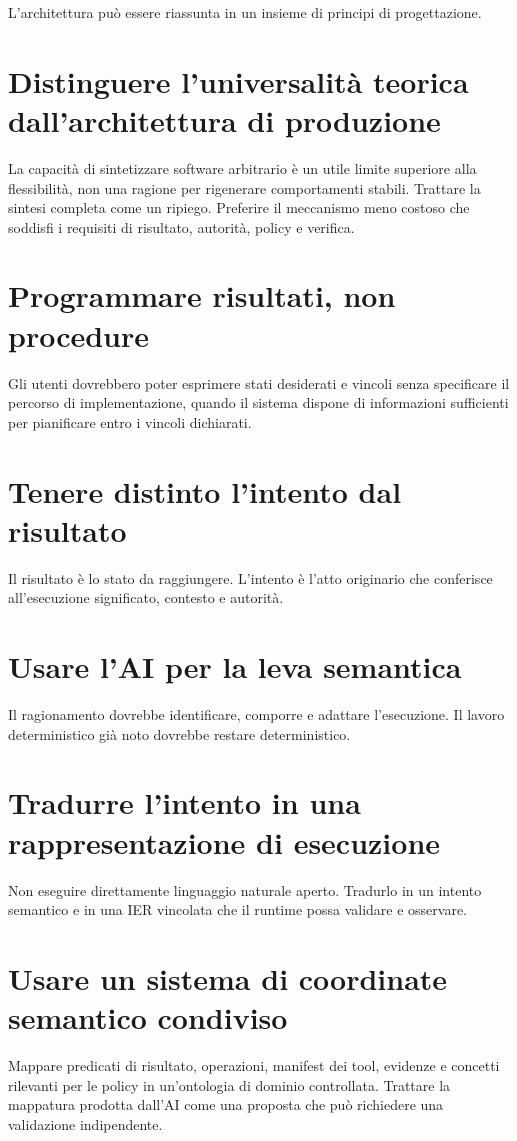 \documentclass[10pt,oneside,openany]{book}
\begin{document}
L'architettura può essere riassunta in un insieme di principi di progettazione.

\section{Distinguere l'universalità teorica dall'architettura di produzione}
La capacità di sintetizzare software arbitrario è un utile limite superiore alla flessibilità, non una ragione per rigenerare comportamenti stabili. Trattare la sintesi completa come un ripiego. Preferire il meccanismo meno costoso che soddisfi i requisiti di risultato, autorità, policy e verifica.

\section{Programmare risultati, non procedure}
Gli utenti dovrebbero poter esprimere stati desiderati e vincoli senza specificare il percorso di implementazione, quando il sistema dispone di informazioni sufficienti per pianificare entro i vincoli dichiarati.

\section{Tenere distinto l'intento dal risultato}
Il risultato è lo stato da raggiungere. L'intento è l'atto originario che conferisce all'esecuzione significato, contesto e autorità.

\section{Usare l'AI per la leva semantica}
Il ragionamento dovrebbe identificare, comporre e adattare l'esecuzione. Il lavoro deterministico già noto dovrebbe restare deterministico.

\section{Tradurre l'intento in una rappresentazione di esecuzione}
Non eseguire direttamente linguaggio naturale aperto. Tradurlo in un intento semantico e in una IER vincolata che il runtime possa validare e osservare.

\section{Usare un sistema di coordinate semantico condiviso}
Mappare predicati di risultato, operazioni, manifest dei tool, evidenze e concetti rilevanti per le policy in un'ontologia di dominio controllata. Trattare la mappatura prodotta dall'AI come una proposta che può richiedere una validazione indipendente.
\end{document}
